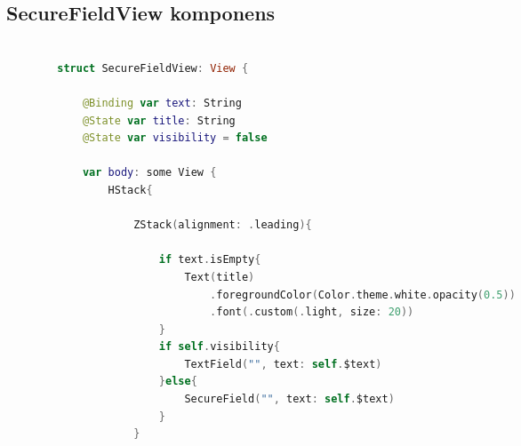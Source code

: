 \subsection*{SecureFieldView komponens}

\begin{spacing}{2}
\end{spacing}
\begin{minipage}{\textwidth}
    \linespread{0.8}\selectfont
    \begin{lstlisting}[language=swift]

        struct SecureFieldView: View {
            
            @Binding var text: String
            @State var title: String
            @State var visibility = false
            
            var body: some View {
                HStack{
                    
                    ZStack(alignment: .leading){
                        
                        if text.isEmpty{
                            Text(title)
                                .foregroundColor(Color.theme.white.opacity(0.5))
                                .font(.custom(.light, size: 20))
                        }
                        if self.visibility{
                            TextField("", text: self.$text)
                        }else{
                            SecureField("", text: self.$text)
                        }
                    }
    \end{lstlisting}   
\end{minipage}
\begin{spacing}{2}
\end{spacing}
\hspace{-10mm}
